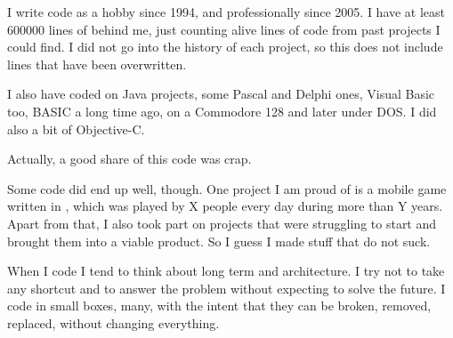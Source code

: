 I write code as a hobby since 1994, and professionally since 2005. I
have at least 600000 lines of \cpp behind me, just counting alive
lines of code from past projects I could find. I did not go into the
history of each project, so this does not include lines that have been
overwritten.

I also have coded on Java projects, some Pascal and Delphi ones,
Visual Basic too, BASIC a long time ago, on a Commodore 128 and later
under DOS. I did also a bit of Objective-C.

Actually, a good share of this code was crap.

Some code did end up well, though. One project I am proud of is a
mobile game written in \cpp, which was played by X people every day
during more than Y years. Apart from that, I also took part on
projects that were struggling to start and brought them into a viable
product. So I guess I made stuff that do not suck.

When I code I tend to think about long term and architecture. I try
not to take any shortcut and to answer the problem without expecting
to solve the future. I code in small boxes, many, with the intent that
they can be broken, removed, replaced, without changing everything.

